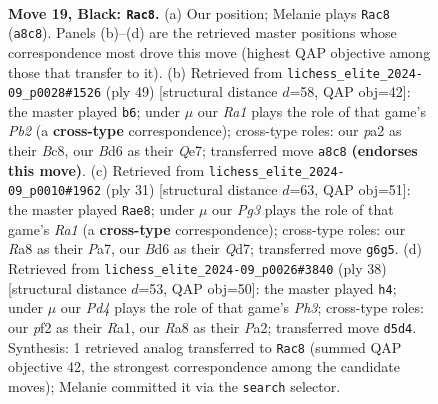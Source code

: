 \documentclass[11pt]{article}
\begin{document}
\clearpage

\begin{figure}[p]\centering
\begin{subfigure}{0.46\textwidth}\centering
\resizebox{\linewidth}{!}{%
\newchessgame
\chessboard[
  setfen={r3r1k1/pp5p/3bpqp1/3pn3/2P5/N5P1/PP2BP1P/R1Q1R1K1 b - - 2 19},
  showmover=false,
  pgfstyle=straightmove, color=movearrow, markmove={a8-c8}
]}
\caption{}
\end{subfigure}\hfill
\begin{subfigure}{0.46\textwidth}\centering
\resizebox{\linewidth}{!}{%
\newchessgame
\chessboard[
  setfen={2b2r1k/1pp1q1pp/5n2/1PN1p3/3rP3/6P1/2Q2PBP/2R1R1K1 b - - 0 25},
  showmover=false,
  pgfstyle=straightmove, color=movearrow, markmove={b7-b6}
]}
\caption{}
\end{subfigure}
\\[4pt]
\begin{subfigure}{0.46\textwidth}\centering
\resizebox{\linewidth}{!}{%
\newchessgame
\chessboard[
  setfen={r4rk1/pppq3p/2n2p2/3p1N2/3PP3/2P5/P1P1Q1PP/R4RK1 b - - 2 16},
  showmover=false,
  pgfstyle=straightmove, color=movearrow, markmove={a8-e8}
]}
\caption{}
\end{subfigure}\hfill
\begin{subfigure}{0.46\textwidth}\centering
\resizebox{\linewidth}{!}{%
\newchessgame
\chessboard[
  setfen={r1q2rk1/p2b1pp1/2p2P1p/3p2n1/3N4/2P3QP/P1P3P1/R4RK1 w - - 0 20},
  showmover=false,
  pgfstyle=straightmove, color=movearrow, markmove={h3-h4}
]}
\caption{}
\end{subfigure}
\caption{\textbf{Move 19, Black: \texttt{Rac8}.} (a) Our position; Melanie plays \texttt{Rac8} (\texttt{a8c8}). Panels (b)--(d) are the retrieved master positions whose correspondence most drove this move (highest QAP objective among those that transfer to it). (b) Retrieved from \texttt{lichess\_elite\_2024-09\_p0028\#1526} (ply 49) [structural distance $d$=58, QAP obj=42]: the master played \texttt{b6}; under $\mu$ our \emph{Ra1} plays the role of that game's \emph{Pb2} (a \textbf{cross-type} correspondence); cross-type roles: our \emph{p}a2 as their \emph{B}c8, our \emph{B}d6 as their \emph{Q}e7; transferred move \texttt{a8c8} \textbf{(endorses this move)}. (c) Retrieved from \texttt{lichess\_elite\_2024-09\_p0010\#1962} (ply 31) [structural distance $d$=63, QAP obj=51]: the master played \texttt{Rae8}; under $\mu$ our \emph{Pg3} plays the role of that game's \emph{Ra1} (a \textbf{cross-type} correspondence); cross-type roles: our \emph{R}a8 as their \emph{P}a7, our \emph{B}d6 as their \emph{Q}d7; transferred move \texttt{g6g5}. (d) Retrieved from \texttt{lichess\_elite\_2024-09\_p0026\#3840} (ply 38) [structural distance $d$=53, QAP obj=50]: the master played \texttt{h4}; under $\mu$ our \emph{Pd4} plays the role of that game's \emph{Ph3}; cross-type roles: our \emph{p}f2 as their \emph{R}a1, our \emph{R}a8 as their \emph{P}a2; transferred move \texttt{d5d4}. Synthesis: 1 retrieved analog transferred to \texttt{Rac8} (summed QAP objective 42, the strongest correspondence among the candidate moves); Melanie committed it via the \texttt{search} selector.}
\label{fig:thought-m37}
\end{figure}
\end{document}
